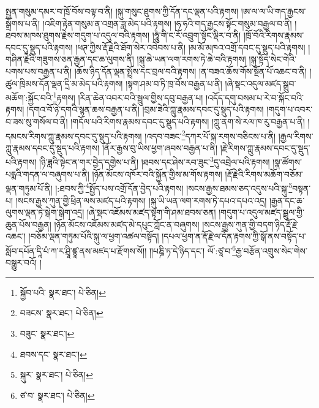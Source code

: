སྤྱན་གསུམ་དམར་བ་ཁྲོ་བོས་བལྟ་བ་ནི། །སྐུ་གསུང་ཐུགས་ཀྱི་དོན་དང་ལྡན་པའི་རྟགས། །ཨ་ལ་ལ་ཡི་གད་རྒྱངས་སྒྲོགས་པ་ནི། །འཇིག་རྟེན་གསུམ་ན་འགྲན་ཟླ་མེད་པའི་རྟགས། །ཧ་ཧའི་གད་རྒྱངས་སྟོང་གསུམ་བརྒྱལ་བ་ནི། །ཐབས་མཁས་ཐུགས་རྗེས་གདུག་པ་འདུལ་བའི་རྟགས། །ཧཱུཾ་གི་ང་རོ་འབྲུག་སྟོང་ལྡིར་བ་ནི། །ཁྲོ་བོའི་རིགས་རྣམས་དབང་དུ་སྡུད་པའི་རྟགས། །ཕཊ་ཀྱིས་རྡོ་རྗེའི་ཐོག་སེར་འབེབས་པ་ནི། །མ་མོ་མཁའ་འགྲོ་དབང་དུ་སྡུད་པའི་རྟགས། །གཤིན་རྗེའི་གཟུགས་ཅན་རྒྱན་དང་ཆ་ལུགས་ནི། །སྐུ་ཆེ་ཡན་ལག་རགས་ཏེ་ཆེ་བའི་རྟགས། །སྐུ་སྟོད་སེང་གེའི་པགས་པས་བརྒྱན་པ་ནི། །ཆོས་ཉིད་དོན་ལྡན་སྤྲོས་དང་བྲལ་བའི་རྟགས། །ན་བཟའ་ཆོས་གོས་སྔོན་པོ་འཆང་བ་ནི། །ཚུལ་ཁྲིམས་དོན་ལྡན་དྲི་མ་མེད་པའི་རྟགས། །སྟག་ཤམ་བ་ཏི་ཁྲ་བོས་བརྒྱན་པ་ནི། །ཞེ་སྡང་འདུལ་མཛད་སྒྲུབ་མཆོག་:སྐྱོང་བའི་\footnote{སྐྱོབ་པའི་  སྣར་ཐང་།  པེ་ཅིན། }རྟགས། །རིན་ཆེན་འབར་བའི་སྦྲུལ་གྱིས་དབུ་བརྒྱན་པ། །འདོད་དགུ་བསམ་པ་རེ་བ་སྐོང་བའི་རྟགས། །དགའ་བོ་ཉེ་དགའི་སྙན་ཆས་བརྒྱན་པ་ནི། །བྲམ་ཟེའི་ཀླུ་རྣམས་དབང་དུ་སྡུད་པའི་རྟགས། །གདུག་པ་འབར་བ་ཟས་སུ་གསོལ་བ་ནི། །གདོལ་པའི་རིགས་རྣམས་དབང་དུ་སྡུད་པའི་རྟགས། །ཀླུ་ནག་སེ་རལ་ཁ་རུ་བརྒྱན་པ་ནི། །དམངས་རིགས་ཀླུ་རྣམས་དབང་དུ་སྡུད་པའི་རྟགས། །འདབ་བཟང་\footnote{བཟངས་  སྣར་ཐང་།  པེ་ཅིན། }དཀར་པོ་སྐ་རགས་བཅིངས་པ་ནི། །རྒྱལ་རིགས་ཀླུ་རྣམས་དབང་དུ་སྡུད་པའི་རྟགས། །ནོར་རྒྱས་བུ་ཡིས་ཕྱག་ཞབས་བརྒྱན་པ་ནི། །རྗེ་རིགས་ཀླུ་རྣམས་དབང་དུ་སྡུད་པའི་རྟགས། །ཉི་ཟླའི་སྟེང་ན་གར་བྱེད་དགྱེས་པ་ནི། །ཐབས་དང་ཤེས་རབ་ཟུང་\footnote{བཟུང་  སྣར་ཐང་། }དུ་འབྲེལ་པའི་རྟགས། །སྣ་ཚོགས་པདྨའི་གདན་ལ་བཞུགས་པ་ནི། །ཉོན་མོངས་འཁོར་བའི་སྐྱོན་གྱིས་མ་གོས་རྟགས། །རྡོ་རྗེའི་རིགས་མཆོག་བཅོམ་ལྡན་གཏུམ་པོ་ནི། །:ཐབས་ཀྱི་\footnote{ཐབས་དང་  སྣར་ཐང་། }སྤྱོད་པས་འགྲོ་དོན་བྱེད་པའི་རྟགས། །སངས་རྒྱས་ཐམས་ཅད་འདུས་པའི་སྐུ་\footnote{སྐུར་  སྣར་ཐང་།  པེ་ཅིན། }བསྟན་པ། །སངས་རྒྱས་ཀུན་གྱི་ཕྲིན་ལས་མཛད་པའི་རྟགས། །སྐུ་ཡི་ཡན་ལག་རགས་ཏེ་དཔའ་དཔའ་འདྲ། །རྒྱན་དང་ཆ་ལུགས་ལྡན་ཏེ་སྒེག་སྒེག་འདྲ། །ཞེ་སྡང་འཇོམས་མཛད་སྟག་གི་ཤམ་ཐབས་ཅན། །གདུག་པ་འདུལ་མཛད་སྦྲུལ་གྱི་ཆུན་པོས་བརྒྱན། །ཉོན་མོངས་འཇོམས་མཛད་མེ་དཔུང་ཀློང་ན་བཞུགས། །སངས་རྒྱས་ཀུན་གྱི་བདག་ཉིད་རྡོ་རྗེ་འཆང་། །བཅོམ་ལྡན་གཏུམ་པོའི་སྐུ་ལ་ཕྱག་འཚལ་བསྟོད། །དཔལ་ཕྱག་ན་རྡོ་རྗེ་ལ་དོན་རྟགས་ཀྱི་སྒོ་ནས་བསྟོད་པ་སློབ་དཔོན་དཱི་པཾ་ཀ་ར་ཤྲཱི་ཛྙཱ་ནས་མཛད་པ་རྫོགས་སོ།། །།པཎྜི་ཏ་དེ་ཉིད་དང་། ལོ་:ཙཱ་བ་\footnote{ཙ་བ་  སྣར་ཐང་།  པེ་ཅིན། }རྒྱ་བརྩོན་འགྲུས་སེང་གེས་བསྒྱུར་བའོ། ། 